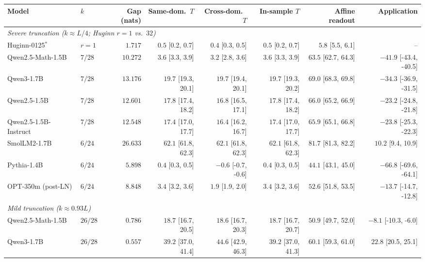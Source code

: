 \begin{table}[t]
\centering
\scriptsize\setlength{\tabcolsep}{3pt}
\begin{tabular}{llrrrrrr}
\toprule
Model & $k$ & Gap (nats) & Same-dom.\ $T$ & Cross-dom.\ $T$ & In-sample $T$ & Affine readout & Application \\
\midrule
\multicolumn{8}{l}{\emph{Severe truncation ($k \approx L/4$; Huginn $r = 1$ vs.\ $32$)}} \\
Huginn-0125$^{\ast}$ & $r=1$ & $1.717$ & $0.5$ {\tiny[0.2, 0.7]} & $0.4$ {\tiny[0.3, 0.5]} & $0.5$ {\tiny[0.2, 0.7]} & $5.8$ {\tiny[5.5, 6.1]} & -- \\
Qwen2.5-Math-1.5B & $7/28$ & $10.272$ & $3.6$ {\tiny[3.3, 3.9]} & $3.2$ {\tiny[2.8, 3.6]} & $3.6$ {\tiny[3.3, 3.9]} & $63.5$ {\tiny[62.7, 64.3]} & $-41.9$ {\tiny[-43.4, -40.5]} \\
Qwen3-1.7B & $7/28$ & $13.176$ & $19.7$ {\tiny[19.3, 20.1]} & $19.7$ {\tiny[19.4, 20.1]} & $19.7$ {\tiny[19.3, 20.2]} & $69.0$ {\tiny[68.3, 69.8]} & $-34.3$ {\tiny[-36.9, -31.5]} \\
Qwen2.5-1.5B & $7/28$ & $12.601$ & $17.8$ {\tiny[17.4, 18.2]} & $16.8$ {\tiny[16.5, 17.1]} & $17.8$ {\tiny[17.4, 18.2]} & $66.0$ {\tiny[65.2, 66.9]} & $-23.2$ {\tiny[-24.8, -21.8]} \\
Qwen2.5-1.5B-Instruct & $7/28$ & $12.548$ & $17.4$ {\tiny[17.0, 17.7]} & $16.4$ {\tiny[16.2, 16.7]} & $17.4$ {\tiny[17.0, 17.7]} & $65.9$ {\tiny[65.1, 66.8]} & $-23.8$ {\tiny[-25.3, -22.3]} \\
SmolLM2-1.7B & $6/24$ & $26.633$ & $62.1$ {\tiny[61.8, 62.3]} & $62.1$ {\tiny[61.8, 62.3]} & $62.1$ {\tiny[61.8, 62.3]} & $81.7$ {\tiny[81.3, 82.2]} & $10.2$ {\tiny[9.4, 10.9]} \\
Pythia-1.4B & $6/24$ & $5.898$ & $0.4$ {\tiny[0.3, 0.5]} & $-0.6$ {\tiny[-0.7, -0.6]} & $0.4$ {\tiny[0.3, 0.5]} & $44.1$ {\tiny[43.1, 45.0]} & $-66.8$ {\tiny[-69.6, -64.1]} \\
OPT-350m (post-LN) & $6/24$ & $8.848$ & $3.4$ {\tiny[3.2, 3.6]} & $1.9$ {\tiny[1.9, 2.0]} & $3.4$ {\tiny[3.2, 3.6]} & $52.6$ {\tiny[51.8, 53.5]} & $-13.7$ {\tiny[-14.7, -12.8]} \\
\midrule
\multicolumn{8}{l}{\emph{Mild truncation ($k \approx 0.93L$)}} \\
Qwen2.5-Math-1.5B & $26/28$ & $0.786$ & $18.7$ {\tiny[16.7, 20.5]} & $18.6$ {\tiny[16.7, 20.3]} & $18.7$ {\tiny[16.7, 20.7]} & $50.9$ {\tiny[49.7, 52.0]} & $-8.1$ {\tiny[-10.3, -6.0]} \\
Qwen3-1.7B & $26/28$ & $0.557$ & $39.2$ {\tiny[37.0, 41.4]} & $44.6$ {\tiny[42.9, 46.3]} & $39.2$ {\tiny[37.0, 41.3]} & $60.1$ {\tiny[59.3, 61.0]} & $22.8$ {\tiny[20.5, 25.1]} \\

\end{tabular}
\end{table}
